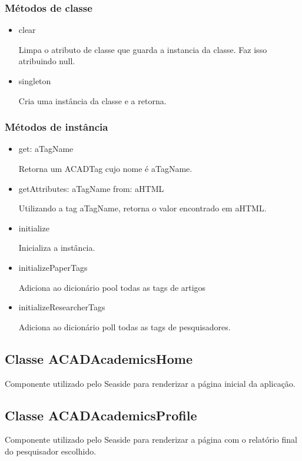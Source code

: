 \subsubsection{Métodos de classe}

\begin{itemize}

  \item clear

  Limpa o atributo de classe que guarda a instancia da classe. Faz isso atribuindo null.

  \item singleton

  Cria uma instância da classe e a retorna.

\end{itemize}

\subsubsection{Métodos de instância}

\begin{itemize}
  \item get: aTagName

  Retorna um ACADTag cujo nome é aTagName.

  \item getAttributes: aTagName from: aHTML

  Utilizando a tag aTagName, retorna o valor encontrado em aHTML.

  \item initialize

  Inicializa a instância.

  \item initializePaperTags

  Adiciona ao dicionário pool todas as tags de artigos

  \item initializeResearcherTags

  Adiciona ao dicionário poll todas as tags de pesquisadores.

\end{itemize}

\subsection{Classe ACADAcademicsHome}

Componente utilizado pelo Seaside para renderizar a página inicial da aplicação.

\subsection{Classe ACADAcademicsProfile}

Componente utilizado pelo Seaside para renderizar a página com o relatório final do pesquisador escolhido.

